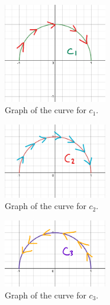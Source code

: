 \documentclass{article}
\begin{document}
\begin{illustrationbox}
    \begin{figure}[H]
        \centering
        \includegraphics[width=0.4\textwidth]{c1.png}
        \caption{Graph of the curve for \( c_1 \).}
        \label{fig:curvesketchingpractice2}
    \end{figure}
    \begin{figure}[H]
        \centering
        \includegraphics[width=0.4\textwidth]{c2.png}
        \caption{Graph of the curve for \( c_2 \).}
        \label{fig:curvesketchingpractice2}
    \end{figure}
    \begin{figure}[H]
        \centering
        \includegraphics[width=0.4\textwidth]{c3.png}
        \caption{Graph of the curve for \( c_3 \).}
        \label{fig:curvesketchingpractice2}
    \end{figure}
\end{illustrationbox}
\end{document}

